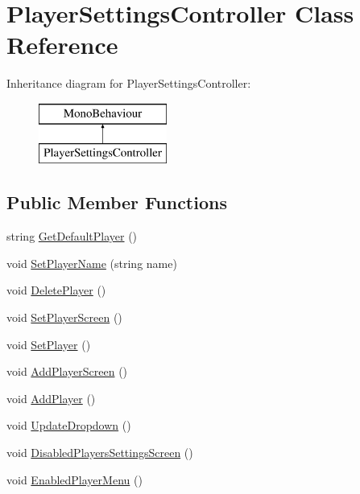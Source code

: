 \hypertarget{class_player_settings_controller}{}\section{Player\+Settings\+Controller Class Reference}
\label{class_player_settings_controller}
Inheritance diagram for Player\+Settings\+Controller\+:\begin{figure}[H]
\begin{center}
\leavevmode
\includegraphics[height=2.000000cm]{class_player_settings_controller}
\end{center}
\end{figure}
\subsection*{Public Member Functions}
\begin{DoxyCompactItemize}
\item 
string \mbox{\hyperlink{class_player_settings_controller_afe5beb9242044767c9067428051a5148}{Get\+Default\+Player}} ()
\item 
void \mbox{\hyperlink{class_player_settings_controller_aeb5c230c4250e9c0c4797cc5b54fd988}{Set\+Player\+Name}} (string name)
\item 
void \mbox{\hyperlink{class_player_settings_controller_a078e103d4e64b8ead6f19a837f62f871}{Delete\+Player}} ()
\item 
void \mbox{\hyperlink{class_player_settings_controller_aa4d9724da02b79dc1ff8d1ed3eba210d}{Set\+Player\+Screen}} ()
\item 
void \mbox{\hyperlink{class_player_settings_controller_a64ae745267b86d4799fd1dd2a4176a5b}{Set\+Player}} ()
\item 
void \mbox{\hyperlink{class_player_settings_controller_a4da6e3b92bd38a61caa5016dd0cfaddf}{Add\+Player\+Screen}} ()
\item 
void \mbox{\hyperlink{class_player_settings_controller_a7fd7c925fb019ca99bd6687d94cecd6c}{Add\+Player}} ()
\item 
void \mbox{\hyperlink{class_player_settings_controller_a69fa150b52c191b94d02906ce506b1d0}{Update\+Dropdown}} ()
\item 
void \mbox{\hyperlink{class_player_settings_controller_a0863cf3830408e7ea23f9d48400a74f1}{Disabled\+Players\+Settings\+Screen}} ()
\item 
void \mbox{\hyperlink{class_player_settings_controller_ad90a456a2fea577d79109f076293de4d}{Enabled\+Player\+Menu}} ()
\end{DoxyCompactItemize}

